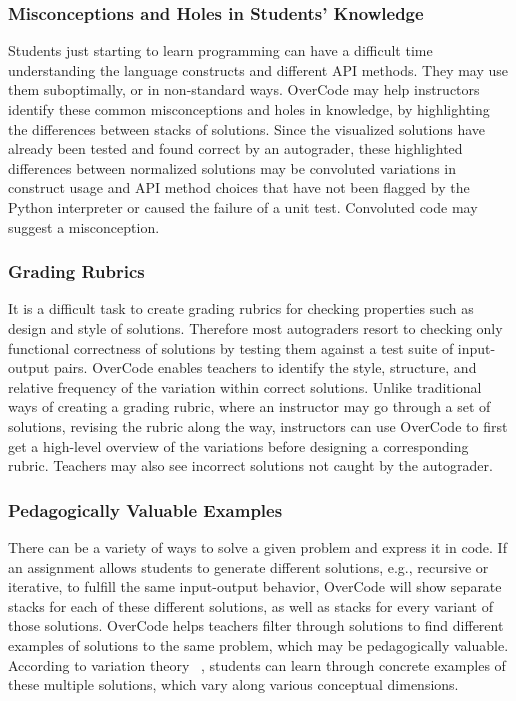 \subsubsection{Misconceptions and Holes in Students' Knowledge}
Students just starting to learn programming can have a difficult time understanding the language constructs and different API methods. They may use them suboptimally, or in non-standard ways. OverCode may help instructors identify these common misconceptions and holes in knowledge, by highlighting the differences between stacks of solutions. Since the visualized solutions have already been tested and found correct by an autograder, these highlighted differences between normalized solutions may be convoluted variations in construct usage and API method choices that have not been flagged by the Python interpreter or caused the failure of a unit test. Convoluted code may suggest a misconception.

\subsubsection{Grading Rubrics}
It is a difficult task to create grading rubrics for checking properties such as design and style of solutions. Therefore most autograders resort to checking only functional correctness of solutions by testing them against a test suite of input-output pairs. OverCode enables teachers to identify the style, structure, and relative frequency of the variation within correct solutions. Unlike traditional ways of creating a grading rubric, where an instructor may go through a set of solutions, revising the rubric along the way, instructors can use OverCode to first get a high-level overview of the variations before designing a corresponding rubric. Teachers may also see incorrect solutions not caught by the autograder.

\subsubsection{Pedagogically Valuable Examples} 
There can be a variety of ways to solve a given problem and express it in code. If an assignment allows students to generate different solutions, e.g., recursive or iterative, to fulfill the same input-output behavior, OverCode will show separate stacks for each of these different solutions, as well as stacks for every variant of those solutions. OverCode helps teachers filter through solutions to find different examples of solutions to the same problem, which may be pedagogically valuable. According to variation theory ~\cite{marton13}, students can learn through concrete examples of these multiple solutions, which vary along various conceptual dimensions.

